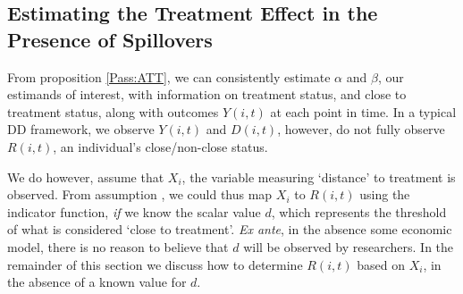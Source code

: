 \subsection{Estimating the Treatment Effect in the Presence of Spillovers}
\label{Ssscn:TE}
From proposition \ref{Pass:ATT}, we can consistently estimate $\alpha$
and $\beta$, our estimands of interest, with information on treatment
status, and close to treatment status, along with outcomes $Y(i,t)$ at
each point in time.  In a typical DD framework, we
observe $Y(i,t)$ and $D(i,t)$, however, do not fully observe $R(i,t)$,
an individual's close/non-close status.

We do however, assume that $X_i$, the variable measuring `distance' to
treatment is observed.  From assumption , we could
thus map $X_i$ to $R(i,t)$ using the indicator function, \emph{if} we
know the scalar value $d$, which represents the threshold of what is
considered `close to treatment'.  \emph{Ex ante}, in the absence some
economic model, there is no reason to believe that $d$ will be
observed by researchers.  In the remainder of this section we discuss
how to determine $R(i,t)$ based on $X_i$, in the absence of a known
value for $d$.

